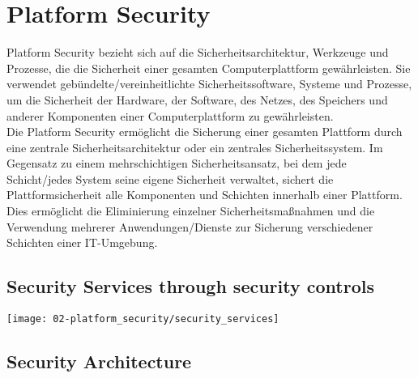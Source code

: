 

\section{Platform Security}
Platform Security bezieht sich auf die Sicherheitsarchitektur, Werkzeuge und Prozesse, die die Sicherheit einer gesamten Computerplattform gewährleisten. Sie verwendet gebündelte/vereinheitlichte Sicherheitssoftware, Systeme und Prozesse, um die Sicherheit der Hardware, der Software, des Netzes, des Speichers und anderer Komponenten einer Computerplattform zu gewährleisten.\\

Die Platform Security ermöglicht die Sicherung einer gesamten Plattform durch eine zentrale Sicherheitsarchitektur oder ein zentrales Sicherheitssystem. Im Gegensatz zu einem mehrschichtigen Sicherheitsansatz, bei dem jede Schicht/jedes System seine eigene Sicherheit verwaltet, sichert die Plattformsicherheit alle Komponenten und Schichten innerhalb einer Plattform. Dies ermöglicht die Eliminierung einzelner Sicherheitsmaßnahmen und die Verwendung mehrerer Anwendungen/Dienste zur Sicherung verschiedener Schichten einer IT-Umgebung.

\subsection{Security Services through security controls}
\begin{center}
    \vspace{-8pt}
    \texttt{[image: 02-platform\_security/security\_services]}
    \vspace{-8pt}
\end{center}

\subsection{Security Architecture}

